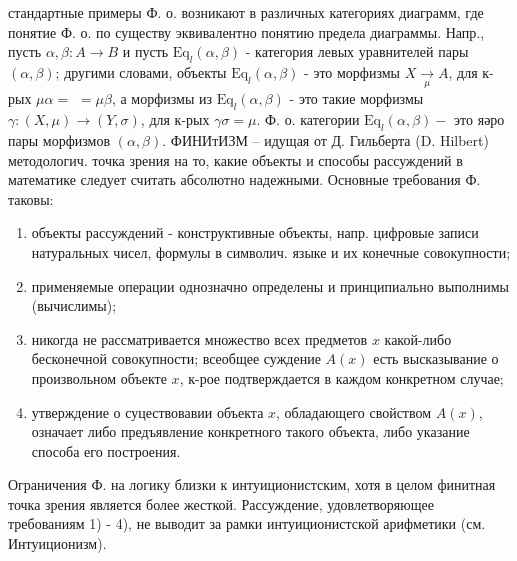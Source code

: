 \documentclass[10pt]{article}
\begin{document}
стандартные примеры Ф. о. возникают в различных категориях диаграмм, где понятие Ф. о. по существу эквивалентно понятию предела диаграммы. Напр., пусть $\alpha, \beta: A \rightarrow B$ и пусть $\mathrm{Eq}_{l}(\alpha, \beta)$ - категория левых уравнителей пары $(\alpha, \beta)$; другими словами, объекты $\mathrm{Eq}_{l}(\alpha, \beta)$ - это морфизмы $X \underset{\mu}{\longrightarrow} A$, для к-рых $\mu \alpha=$ $=\mu \beta$, а морфизмы из $\mathrm{Eq}_{l}(\alpha, \beta)$ - это такие морфизмы $\gamma:(X, \mu) \rightarrow(Y, \sigma)$, для к-рых $\gamma \sigma=\mu$. Ф. о. категории $\mathrm{Eq}_{l}(\alpha, \beta)-$ это яәро пары морфизмов $(\alpha, \beta)$. ФИНИтИЗМ -- идущая от Д. Гильберта (D. Hilbert) методологич. точка зрения на то, какие объекты и способы рассуждений в математике следует считать абсолютно надежными. Основные требования Ф. таковы:



\begin{enumerate}

  \item объекты рассуждений - конструктивные объекты, напр. цифровые записи натуральных чисел, формулы в символич. языке и их конечные совокупности;



  \item применяемые операции однозначно определены и принципиально выполнимы (вычислимы);



  \item никогда не рассматривается множество всех предметов $x$ какой-либо бесконечной совокупности; всеобщее суждение $A(x)$ есть высказывание о произвольном объекте $x$, к-рое подтверждается в каждом конкретном случае;



  \item утверждение о суцествовавии объекта $x$, обладающего свойством $A(x)$, означает либо предъявление конкретного такого объекта, либо указание способа его построения.



\end{enumerate}



Ограничения Ф. на логику близки к интуиционистским, хотя в целом финитная точка зрения является более жесткой. Рассуждение, удовлетворяющее требованиям 1) - 4), не выводит за рамки интуиционистской арифметики (см. Интуиционизм).
\end{document}
